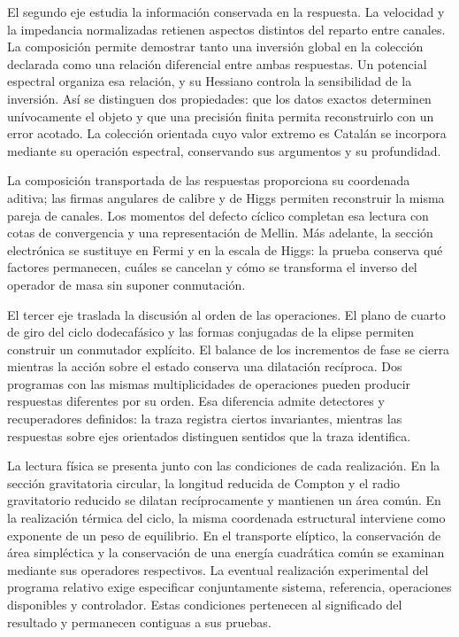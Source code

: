 El segundo eje estudia la información conservada en la respuesta. La
velocidad y la impedancia normalizadas retienen aspectos distintos del
reparto entre canales. La composición permite demostrar tanto una inversión
global en la colección declarada como una relación diferencial entre ambas
respuestas. Un potencial espectral organiza esa relación, y su Hessiano
controla la sensibilidad de la inversión. Así se distinguen dos propiedades:
que los datos exactos determinen unívocamente el objeto y que una precisión
finita permita reconstruirlo con un error acotado. La colección orientada cuyo
valor extremo es Catalán se incorpora mediante su operación espectral,
conservando sus argumentos y su profundidad.

La composición transportada de las respuestas proporciona su coordenada
aditiva; las firmas angulares de calibre y de Higgs permiten reconstruir
la misma pareja de canales. Los momentos del defecto cíclico completan
esa lectura con cotas de convergencia y una representación de Mellin.
Más adelante, la sección electrónica se sustituye en Fermi y en la escala
de Higgs: la prueba conserva qué factores permanecen, cuáles se cancelan
y cómo se transforma el inverso del operador de masa sin suponer conmutación.

El tercer eje traslada la discusión al orden de las operaciones. El plano
de cuarto de giro del ciclo dodecafásico y las formas conjugadas de la
elipse permiten construir un conmutador explícito. El balance de los
incrementos de fase se cierra mientras la acción sobre el estado conserva
una dilatación recíproca. Dos programas con las mismas multiplicidades de
operaciones pueden producir respuestas diferentes por su orden. Esa
diferencia admite detectores y recuperadores definidos: la traza registra
ciertos invariantes, mientras las respuestas sobre ejes orientados
distinguen sentidos que la traza identifica.

La lectura física se presenta junto con las condiciones de cada
realización. En la sección gravitatoria circular, la longitud reducida
de Compton y el radio gravitatorio reducido se dilatan recíprocamente y
mantienen un área común. En la realización térmica del ciclo, la misma
coordenada estructural interviene como exponente de un peso de equilibrio.
En el transporte elíptico, la conservación de área simpléctica y la
conservación de una energía cuadrática común se examinan mediante sus
operadores respectivos. La eventual realización experimental del programa
relativo exige especificar conjuntamente sistema, referencia, operaciones
disponibles y controlador. Estas condiciones pertenecen al significado
del resultado y permanecen contiguas a sus pruebas.

